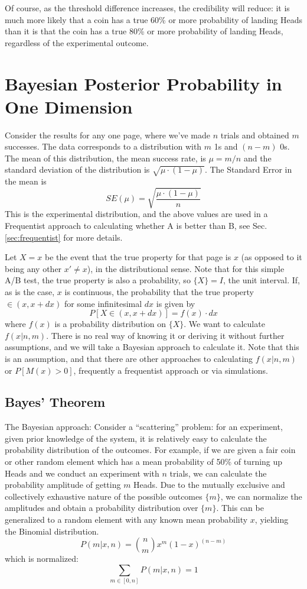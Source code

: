 \documentclass[12pt]{report}
\newcommand{\bdm}{\begin{displaymath}} %
\newcommand{\edm}{\end{displaymath}} %
\begin{document}
Of course, as the threshold difference increases, the credibility will
reduce: it is much more likely that a coin has a true 60\% or more probability
of landing Heads than it is that the coin has a true 80\% or more probability of
landing Heads, regardless of the experimental outcome.


\section{Bayesian Posterior Probability in One Dimension\label{sec:Bayesian1D}}
Consider the results for any one page, where we've made \(n\) trials
and obtained \(m\) successes.  The data corresponds to a distribution
with \(m\) 1s and \((n-m)\) 0s. The mean of this distribution, the
mean success rate, is \(\mu = m/n\) and the standard deviation of the
distribution is \(\sqrt{\mu\cdot (1-\mu)}\). The Standard Error in the
mean is
\bdm
  SE(\mu) = \sqrt{\frac{\mu\cdot(1-\mu)}{n}}
\edm
This is the experimental distribution, and the above values are used
in a Frequentist approach to calculating whether A is better than B,
see Sec.\ref{sec:frequentist} for more details.

Let \(X = x\) be the event that the
true property for that page is \(x\) (as opposed to it being any other
\(x'\neq x\)), in the distributional sense. Note that for this simple A/B test,
the true property is also a probability, so \(\{X\}=I\), the unit interval. 
If, as is the case, \(x\) is continuous, the probability that the true property
\(\in(x, x+dx)\) for some infinitesimal \(dx\) is given by
\bdm
P[X\in (x, x+dx)] = f(x)\cdot dx
\edm
where
\(f(x)\) is a probability distribution on \(\{X\}\). We
want to calculate \(f(x|n,m)\). There is no real way of knowing it or
deriving it without further assumptions, and we will take a Bayesian
approach to calculate it. Note that this is an assumption, and that
there are other approaches to calculating \(f(x|n,m)\) or \(P[M(x)>0]\),
frequently a frequentist approach or via simulations.


\subsection{Bayes' Theorem}

The Bayesian approach: Consider a ``scattering'' problem: for an
experiment, given prior knowledge of
the system, it is relatively easy to calculate the
probability distribution of the outcomes. For example, if we are given
a fair coin or other random element which has a mean probability of
50\% of turning up Heads and we conduct an experiment with \(n\)
trials, we can calculate the probability amplitude of getting \(m\)
Heads. Due to the mutually exclusive and collectively exhaustive
nature of the possible outcomes \(\{m\}\), we can normalize the
amplitudes and obtain a probability distribution over \(\{m\}\). This
can be generalized to a random element with any known mean probability
\(x\), yielding the Binomial distribution.
\bdm
P(m|x,n)={n \choose m}x^m (1-x)^{(n-m)}
\edm
which is normalized:
\bdm
\sum_{m\in[0,n]} P(m|x,n) = 1
\edm
\end{document}
